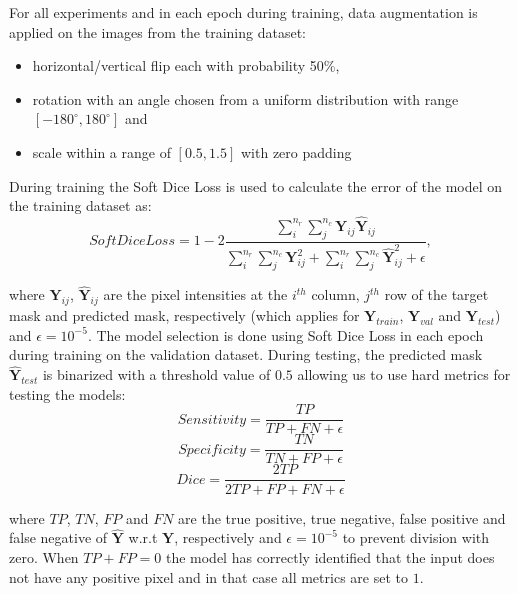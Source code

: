 \documentclass{elsarticle}
\begin{document}
For all experiments and in each epoch during training, data augmentation is applied on the images from the training dataset:
\begin{itemize}
  \item horizontal/vertical flip each with probability 50\%,
  \item rotation with an angle chosen from a uniform distribution with range $[-180^{\circ}, 180^{\circ}]$ and
  \item scale within a range of $[0.5, 1.5]$ with zero padding
\end{itemize}

During training the Soft Dice Loss is used to calculate the error of the model on the training dataset as:
\begin{equation}
  Soft Dice Loss = 1 - 2\frac{\sum\limits^{n_r}_i\sum\limits^{n_c}_j\bm{Y}_{ij}\hat{\bm{Y}}_{ij}}{\sum\limits^{n_r}_i\sum\limits^{n_c}_j\bm{Y}_{ij}^2 + \sum\limits^{n_r}_i\sum\limits^{n_c}_j\hat{\bm{Y}}_{ij}^2 + \epsilon},
\end{equation}

where $\bm{Y}_{ij}$, $\hat{\bm{Y}}_{ij}$ are the pixel intensities at the $i^{th}$ column, $j^{th}$ row of the target mask and predicted mask, respectively (which applies for $\bm{Y}_{train}$, $\bm{Y}_{val}$ and $\bm{Y}_{test}$) and $\epsilon=10^{-5}$.
The model selection is done using Soft Dice Loss in each epoch during training on the validation dataset.
During testing, the predicted mask $\hat{\bm{Y}}_{test}$ is binarized with a threshold value of $0.5$ allowing us to use hard metrics for testing the models:
\begin{equation}
  Sensitivity = \frac{TP}{TP + FN + \epsilon}
\end{equation}
\begin{equation}
  Specificity = \frac{TN}{TN + FP + \epsilon}
\end{equation}
\begin{equation}
  Dice = \frac{2TP}{2TP + FP + FN + \epsilon}
\end{equation}

where $TP$, $TN$, $FP$ and $FN$ are the true positive, true negative, false positive and false negative of $\hat{\bm{Y}}$ w.r.t $\bm{Y}$, respectively and $\epsilon=10^{-5}$ to prevent division with zero.
When $TP+FP=0$ the model has correctly identified that the input does not have any positive pixel and in that case all metrics are set to $1$.
\end{document}
